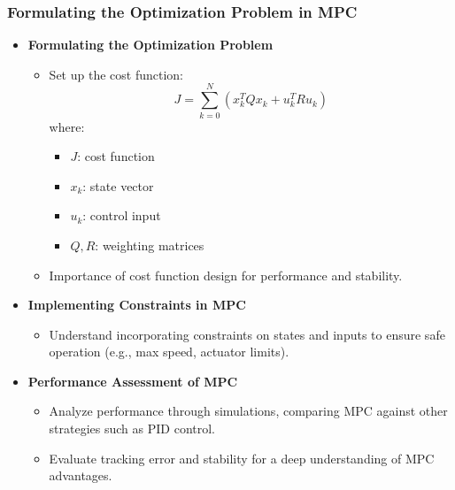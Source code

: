\documentclass[aspectratio=169]{beamer}
\begin{document}
\begin{frame}[fragile]
    \frametitle{Formulating the Optimization Problem in MPC}
    \begin{itemize}
        \item \textbf{Formulating the Optimization Problem}
        \begin{itemize}
            \item Set up the cost function:
            \begin{equation}
                J = \sum_{k=0}^{N} \left( x_k^T Q x_k + u_k^T R u_k \right)  
            \end{equation}
            where:
            \begin{itemize}
                \item \( J \): cost function
                \item \( x_k \): state vector
                \item \( u_k \): control input
                \item \( Q, R \): weighting matrices
            \end{itemize}
            \item Importance of cost function design for performance and stability.
        \end{itemize}
        
        \item \textbf{Implementing Constraints in MPC}
        \begin{itemize}
            \item Understand incorporating constraints on states and inputs to ensure safe operation (e.g., max speed, actuator limits).
        \end{itemize}

        \item \textbf{Performance Assessment of MPC}
        \begin{itemize}
            \item Analyze performance through simulations, comparing MPC against other strategies such as PID control.
            \item Evaluate tracking error and stability for a deep understanding of MPC advantages.
        \end{itemize}
    \end{itemize}
\end{frame}
\end{document}
